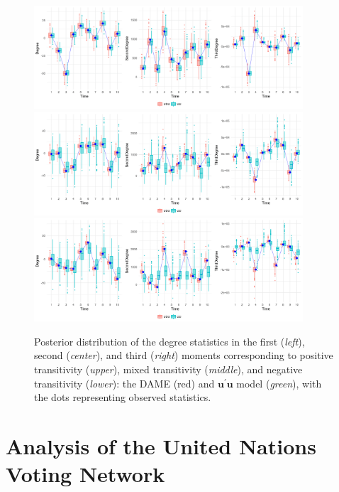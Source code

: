 \documentclass[a4paper]{article}
\begin{document}
\begin{figure}[H]
	\centering
			\includegraphics[width=0.895\textwidth]{plots_paper/newpositiveD-1.png}	
		\includegraphics[width=0.895\textwidth]{plots_paper/newmixedD-1.png}	
						\includegraphics[width=0.895\textwidth]{plots_paper/newnegativeD-1.png}	
	\caption {Posterior distribution of the degree statistics in the first (\textit{left}), second (\textit{center}), and third (\textit{right}) moments corresponding to positive transitivity (\textit{upper}), mixed transitivity (\textit{middle}), and negative transitivity (\textit{lower}): the DAME (red) and $\boldsymbol{u}^\prime \boldsymbol{u}$ model (\textit{green}), with the dots representing observed statistics.}
	\label{figure:negativitystudy}
\end{figure}

\section{Analysis of the United Nations Voting Network}\label{sec: UNvoting}
\end{document}
